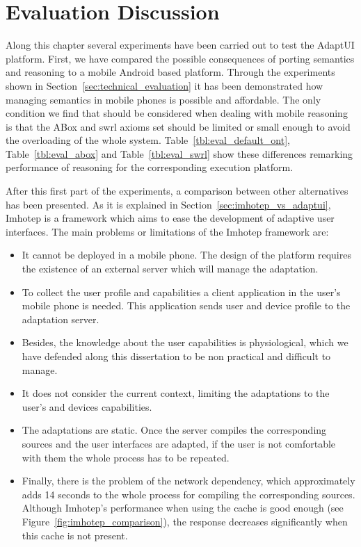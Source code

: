 \section{Evaluation Discussion}
\label{sec:evaluation_discussion}

Along this chapter several experiments have been carried out to test the AdaptUI
platform. First, we have compared the possible consequences of porting semantics
and reasoning to a mobile Android based platform. Through the experiments shown 
in Section~\ref{sec:technical_evaluation} it has been demonstrated how managing 
semantics in mobile phones is possible and affordable. The only condition we 
find that should be considered when dealing with mobile reasoning is that the 
ABox and \ac{swrl} axioms set should be limited or small enough to avoid the 
overloading of the whole system. Table~\ref{tbl:eval_default_ont},
Table~\ref{tbl:eval_abox} and Table~\ref{tbl:eval_swrl} show these differences 
remarking performance of reasoning for the corresponding execution platform.

After this first part of the experiments, a comparison between other 
alternatives has been presented. As it is explained in 
Section~\ref{sec:imhotep_vs_adaptui}, Imhotep is a framework which aims to ease 
the development of adaptive user interfaces. The main problems or limitations 
of the Imhotep framework are: 

\begin{itemize}
  \item It cannot be deployed in a mobile phone. The design of the platform
  requires the existence of an external server which will manage the adaptation.
  
  \item To collect the user profile and capabilities a client application in
  the user's mobile phone is needed. This application sends user and device
  profile to the adaptation server.
  
  \item Besides, the knowledge about the user capabilities is physiological,
  which we have defended along this dissertation to be non practical and 
difficult
  to manage.
  
  \item It does not consider the current context, limiting the adaptations
  to the user's and devices capabilities.
  
  \item The adaptations are static. Once the server compiles the corresponding
  sources and the user interfaces are adapted, if the user is not comfortable
  with them the whole process has to be repeated.
  
  \item Finally, there is the problem of the network dependency, which 
  approximately adds 14 seconds to the whole process for compiling the 
  corresponding sources. Although Imhotep's performance when using the cache is 
  good enough (see Figure~\ref{fig:imhotep_comparison}), the response decreases 
  significantly  when this cache is not present.
\end{itemize}



